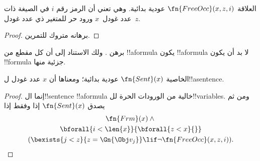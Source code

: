 \documentclass[../../../include/open-logic-section]{subfiles}
\begin{document}
\begin{prop}
العلاقة $\fn{FreeOcc}(x,z,i)$ عودية بدائية. وهي تعني
أن الرمز رقم $i$ في الصيغة ذات عدد غودل~$x$
ورود حر للمتغير ذي عدد غودل~$z$.
\end{prop}

\begin{proof}
برهانه متروك للتمرين.
\end{proof}

\begin{prob}
برهن . ولك الاستناد إلى أن كل مقطع من !!a{formula} يكون !!a{formula} لا بد أن يكون
!!{formula} جزئية منها.
\end{prob}

\begin{prop}
الخاصية $\fn{Sent}(x)$ عودية بدائية؛ ومعناها أن $x$
عدد غودل ل!!a{sentence}.
\end{prop}

\begin{proof}
إنما ال!!{sentence} !!a{formula} خالية من الورودات الحرة
  لل!!{variable}s. ومن ثم يصدق $\fn{Sent}(x)$ إذا وفقط إذا
\begin{multline*}
\fn{Frm}(x) \land {}\\
\bforall{i<\len{x}}{\bforall{z<x}{}}\\
(\bexists{j<z}{z=\Gn{\Obj v_j}} \lif \lnot\fn{FreeOcc}(x,z,i)).
\end{multline*}
\end{proof}
\end{document}
